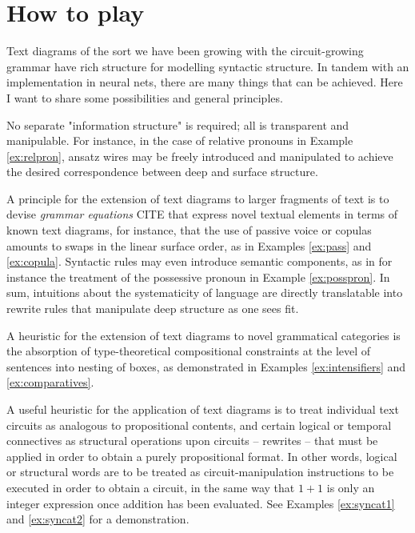 \section{How to play}

Text diagrams of the sort we have been growing with the circuit-growing grammar have rich structure for modelling syntactic structure. In tandem with an implementation in neural nets, there are many things that can be achieved. Here I want to share some possibilities and general principles.

 No separate "information structure" is required; all is transparent and manipulable. For instance, in the case of relative pronouns in Example \ref{ex:relpron}, ansatz wires may be freely introduced and manipulated to achieve the desired correspondence between deep and surface structure.

 A principle for the extension of text diagrams to larger fragments of text is to devise \emph{grammar equations} \bR CITE \e that express novel textual elements in terms of known text diagrams, for instance, that the use of passive voice or copulas amounts to swaps in the linear surface order, as in Examples \ref{ex:pass} and \ref{ex:copula}. Syntactic rules may even introduce semantic components, as in for instance the treatment of the possessive pronoun in Example \ref{ex:posspron}. In sum, intuitions about the systematicity of language are directly translatable into rewrite rules that manipulate deep structure as one sees fit.

 A heuristic for the extension of text diagrams to novel grammatical categories is the absorption of type-theoretical compositional constraints at the level of sentences into nesting of boxes, as demonstrated in Examples \ref{ex:intensifiers} and \ref{ex:comparatives}.

 A useful heuristic for the application of text diagrams is to treat individual text circuits as analogous to propositional contents, and certain logical or temporal connectives as structural operations upon circuits -- rewrites -- that must be applied in order to obtain a purely propositional format. In other words, logical or structural words are to be treated as circuit-manipulation instructions to be executed in order to obtain a circuit, in the same way that $1 + 1$ is only an integer expression once addition has been evaluated. See Examples \ref{ex:syncat1} and \ref{ex:syncat2} for a demonstration.

